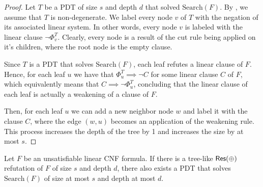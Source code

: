 \begin{proof}
    Let $T$ be a PDT of size $s$ and depth $d$ that solved $\mathrm{Search}(F)$. By , we assume that $T$ is non-degenerate. We label every node $v$ of $T$ with the negation of its associated linear system. In other words, every node $v$ is labeled with the linear clause $\lnot \Phi_v^T$. Clearly, every node is a result of the cut rule being applied on it's children, where the root node is the empty clause.

    Since $T$ is a PDT that solves $\mathrm{Search}(F)$, each leaf refutes a linear clause of $F$. Hence, for each leaf $u$ we have that $\Phi_{u}^T \implies \lnot C$ for some linear clause $C$ of $F$, which equivalently means that $C \implies \lnot \Phi_u^T$, concluding that the linear clause of each leaf is actually a weakening of a clause of $F$.
    
    Then, for each leaf $u$ we can add a new neighbor node $w$ and label it with the clause $C$, where the edge $(w,u)$ becomes an application of the weakening rule. This process increases the depth of the tree by 1 and increases the size by at most $s$.

\end{proof}


\begin{lemma}
    Let $F$ be an unsatisfiable linear CNF formula. If there is a tree-like $\mathsf{Res(\oplus)}$ refutation of $F$ of size $s$ and depth $d$, there also exists a PDT that solves $\mathrm{Search}(F)$ of size at most $s$ and depth at most $d$.
\end{lemma}


